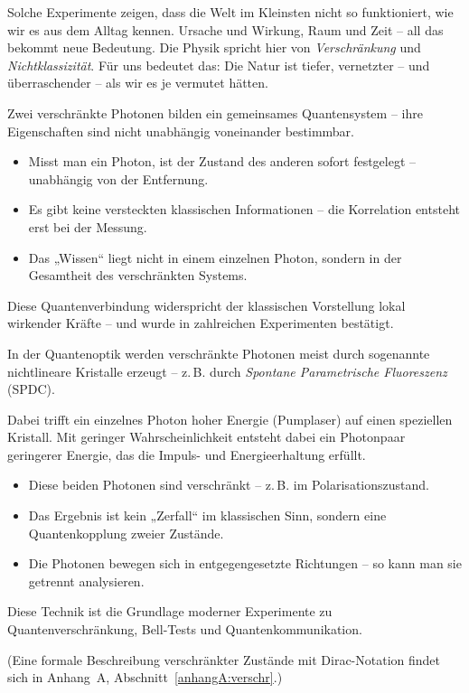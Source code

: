 Solche Experimente zeigen, dass die Welt im Kleinsten nicht so funktioniert, wie wir es aus dem Alltag kennen. Ursache und Wirkung, Raum und Zeit – all das bekommt neue Bedeutung. Die Physik spricht hier von \textit{Verschränkung} und \textit{Nichtklassizität}. Für uns bedeutet das: Die Natur ist tiefer, vernetzter – und überraschender – als wir es je vermutet hätten.
\
\medskip
\begin{tcolorbox}[didaktikbox, title=Was bedeutet Verschränkung?]
	\label{box:verschr}
	Zwei verschränkte Photonen bilden ein gemeinsames Quantensystem – ihre Eigenschaften sind nicht unabhängig voneinander bestimmbar.
	
	\begin{itemize}
		\item Misst man ein Photon, ist der Zustand des anderen sofort festgelegt – unabhängig von der Entfernung.
		\item Es gibt keine versteckten klassischen Informationen – die Korrelation entsteht erst bei der Messung.
		\item Das „Wissen“ liegt nicht in einem einzelnen Photon, sondern in der Gesamtheit des verschränkten Systems.
	\end{itemize}
	
	Diese Quantenverbindung widerspricht der klassischen Vorstellung lokal wirkender Kräfte – und wurde in zahlreichen Experimenten bestätigt.
\end{tcolorbox}
\medskip
\begin{tcolorbox}[physikbox, title=Wie entstehen verschränkte Photonen?]
	\label{box:spdc}
	In der Quantenoptik werden verschränkte Photonen meist durch sogenannte nichtlineare Kristalle erzeugt – z.\,B. durch \emph{Spontane Parametrische Fluoreszenz} (SPDC).
	
	Dabei trifft ein einzelnes Photon hoher Energie (Pumplaser) auf einen speziellen Kristall. Mit geringer Wahrscheinlichkeit entsteht dabei ein Photonpaar geringerer Energie, das die Impuls- und Energieerhaltung erfüllt.
	
	\begin{itemize}
		\item Diese beiden Photonen sind verschränkt – z.\,B. im Polarisationszustand.
		\item Das Ergebnis ist kein „Zerfall“ im klassischen Sinn, sondern eine Quantenkopplung zweier Zustände.
		\item Die Photonen bewegen sich in entgegengesetzte Richtungen – so kann man sie getrennt analysieren.
	\end{itemize}
	
	Diese Technik ist die Grundlage moderner Experimente zu Quantenverschränkung, Bell-Tests und Quantenkommunikation.
\end{tcolorbox}
(Eine formale Beschreibung verschränkter Zustände mit Dirac-Notation findet sich in Anhang~A, Abschnitt~\ref{anhangA:verschr}.)

